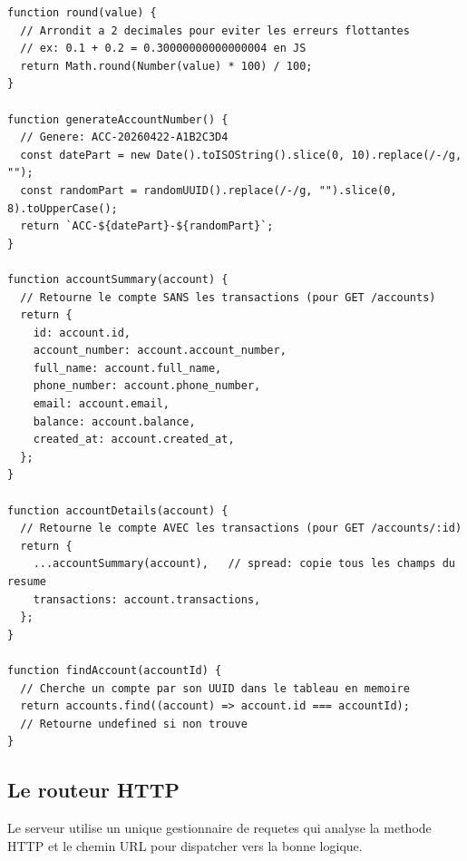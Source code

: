 \documentclass[12pt,a4paper]{article}
\begin{document}
\begin{lstlisting}[style=js, caption={server.js --- Fonctions metier}]
function round(value) {
  // Arrondit a 2 decimales pour eviter les erreurs flottantes
  // ex: 0.1 + 0.2 = 0.30000000000000004 en JS
  return Math.round(Number(value) * 100) / 100;
}

function generateAccountNumber() {
  // Genere: ACC-20260422-A1B2C3D4
  const datePart = new Date().toISOString().slice(0, 10).replace(/-/g, "");
  const randomPart = randomUUID().replace(/-/g, "").slice(0, 8).toUpperCase();
  return `ACC-${datePart}-${randomPart}`;
}

function accountSummary(account) {
  // Retourne le compte SANS les transactions (pour GET /accounts)
  return {
    id: account.id,
    account_number: account.account_number,
    full_name: account.full_name,
    phone_number: account.phone_number,
    email: account.email,
    balance: account.balance,
    created_at: account.created_at,
  };
}

function accountDetails(account) {
  // Retourne le compte AVEC les transactions (pour GET /accounts/:id)
  return {
    ...accountSummary(account),   // spread: copie tous les champs du resume
    transactions: account.transactions,
  };
}

function findAccount(accountId) {
  // Cherche un compte par son UUID dans le tableau en memoire
  return accounts.find((account) => account.id === accountId);
  // Retourne undefined si non trouve
}
\end{lstlisting}

\subsection{Le routeur HTTP}

Le serveur utilise un unique gestionnaire de requetes qui analyse la methode HTTP et le chemin URL pour dispatcher vers la bonne logique.
\end{document}
